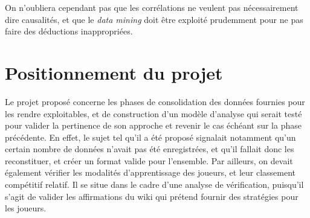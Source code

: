 On n'oubliera cependant pas que les corrélations ne veulent pas nécessairement dire causalités, et que le \textit{data mining} doit être exploité prudemment pour ne pas faire des déductions inappropriées. 



\section{Positionnement du projet}
Le projet proposé concerne les phases de consolidation des données fournies pour les rendre exploitables, et de construction d'un modèle d'analyse qui serait testé pour valider la pertinence de son approche et revenir le cas échéant sur la phase précédente. 
En effet, le sujet tel qu'il a été proposé signalait notamment qu'un certain nombre de données n'avait pas été enregistrées, et qu'il fallait donc les reconstituer, et créer un format valide pour l'ensemble. Par ailleurs, on devait également vérifier les modalités d'apprentissage des joueurs, et leur classement compétitif relatif. 
Il se situe dans le cadre d'une analyse de vérification, puisqu'il s'agit de valider les affirmations du wiki qui prétend fournir des stratégies pour les joueurs. 











